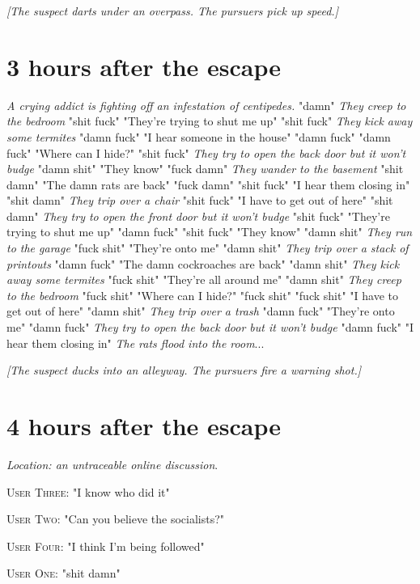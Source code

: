 \documentclass{report}
\begin{document}
\textit{[The suspect darts under an overpass. The pursuers pick up speed.]}


\section*{3 \small{hours after the escape}}

\textit{A crying addict is fighting off an infestation of centipedes.} "damn" \textit{They creep to the bedroom} "shit fuck" "They're trying to shut me up" "shit fuck" \textit{They kick away some termites} "damn fuck" "I hear someone in the house" "damn fuck" \textit{} "damn fuck" "Where can I hide?" "shit fuck" \textit{They try to open the back door but it won't budge} "damn shit" "They know" "fuck damn" \textit{They wander to the basement} "shit damn" "The damn rats are back" "fuck damn" \textit{} "shit fuck" "I hear them closing in" "shit damn" \textit{They trip over a chair} "shit fuck" "I have to get out of here" "shit damn" \textit{They try to open the front door but it won't budge} "shit fuck" "They're trying to shut me up" "damn fuck" \textit{} "shit fuck" "They know" "damn shit" \textit{They run to the garage} "fuck shit" "They're onto me" "damn shit" \textit{They trip over a stack of printouts} "damn fuck" "The damn cockroaches are back" "damn shit" \textit{They kick away some termites} "fuck shit" "They're all around me" "damn shit" \textit{They creep to the bedroom} "fuck shit" "Where can I hide?" "fuck shit" \textit{} "fuck shit" "I have to get out of here" "damn shit" \textit{They trip over a trash} "damn fuck" "They're onto me" "damn fuck" \textit{They try to open the back door but it won't budge} "damn fuck" "I hear them closing in" \textit{The rats flood into the room}...

\textit{[The suspect ducks into an alleyway. The pursuers fire a warning shot.]}


\section*{4 \small{hours after the escape}}

\textit{Location: an untraceable online discussion}. 

\textsc{User Three}: "I know who did it" 

\textsc{User Two}: "Can you believe the socialists?" 

\textsc{User Four}: "I think I'm being followed" 

\textsc{User One}: "shit damn" 
\end{document}
